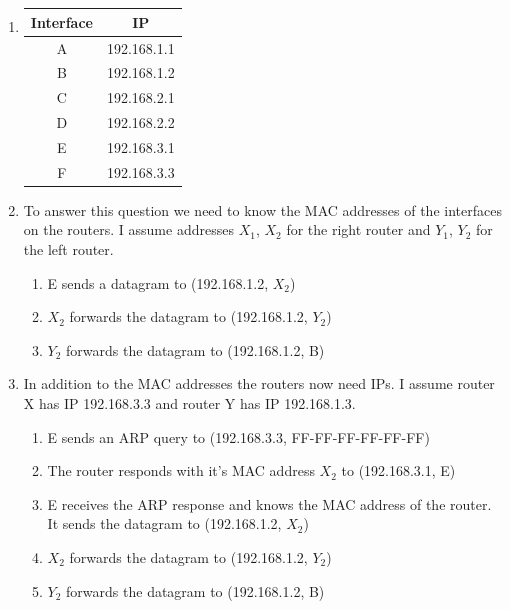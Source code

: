\documentclass[12pt, a4paper]{article}
\begin{document}
\section{} %
\begin{enumerate}
	\item %
	\begin{tabular}{|c|c|}
		\hline
		Interface & IP\\\hline
		A & 192.168.1.1\\\hline
		B & 192.168.1.2\\\hline
		C & 192.168.2.1\\\hline
		D & 192.168.2.2\\\hline
		E & 192.168.3.1\\\hline
		F & 192.168.3.3\\\hline
	\end{tabular}

	\item %
	To answer this question we need to know the MAC addresses of the interfaces on the routers. I assume addresses $X_1$, $X_2$ for the right router and $Y_1$, $Y_2$ for the left router.

	\begin{enumerate}
		\item E sends a datagram to (192.168.1.2, $X_2$)
		\item $X_2$ forwards the datagram to (192.168.1.2, $Y_2$)
		\item $Y_2$ forwards the datagram to (192.168.1.2, B)
	\end{enumerate}

	\item %
	In addition to the MAC addresses the routers now need IPs. I assume router X has IP 192.168.3.3 and router Y has IP 192.168.1.3.

	\begin{enumerate}
		\item E sends an ARP query to (192.168.3.3, FF-FF-FF-FF-FF-FF)
		\item The router responds with it's MAC address $X_2$ to (192.168.3.1, E)
		\item E receives the ARP response and knows the MAC address of the router. It sends the datagram to (192.168.1.2, $X_2$)
		\item $X_2$ forwards the datagram to (192.168.1.2, $Y_2$)
		\item $Y_2$ forwards the datagram to (192.168.1.2, B)
	\end{enumerate}
\end{enumerate}
\end{document}

